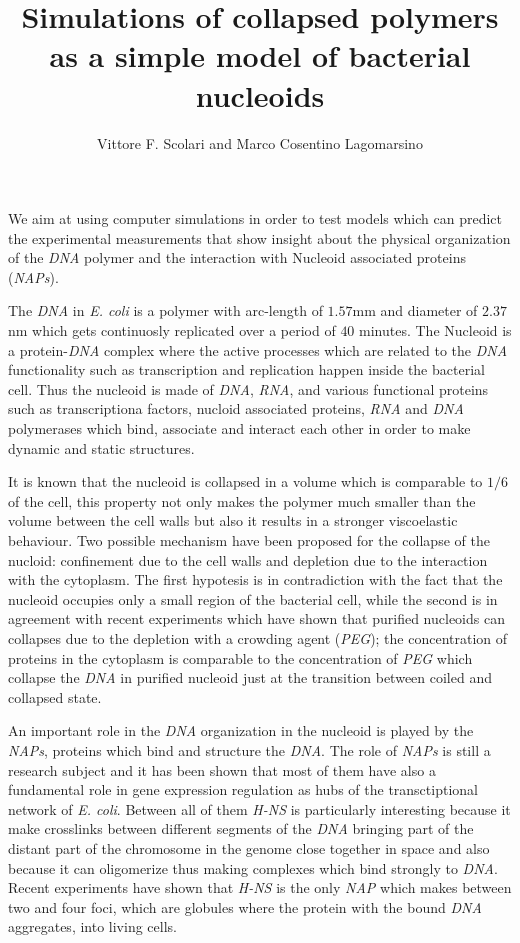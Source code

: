\documentclass[12pt,a4paper,notitlepage]{article}
\newcommand{\hns}{\emph{H-NS}\xspace}
\newcommand{\ecoli}{\emph{E. coli}\xspace}
\newcommand{\dna}{\emph{DNA}\xspace}
\newcommand{\rna}{\emph{RNA}\xspace}
\newcommand{\nap}{\emph{NAP}\xspace}
\newcommand{\naps}{\emph{NAPs}\xspace}
\begin{document}
\title{Simulations of collapsed polymers as a simple model of
  bacterial nucleoids}
\author{Vittore F. Scolari and Marco Cosentino Lagomarsino}
\maketitle
We aim at using computer simulations in order to test models which can
 predict the experimental measurements
\cite{Lieberman2009, Weber2010, Barbieri2012}
that show insight about the physical organization of the \dna polymer and
the interaction with Nucleoid associated proteins (\naps).

The \dna in \ecoli is a polymer with arc-length of $1.57$mm and
diameter of $2.37$nm which gets continuosly replicated over a period
of $40$ minutes. The Nucleoid is a protein-\dna complex where the
active processes which are related to the \dna functionality such as
transcription and replication happen inside the bacterial cell. Thus
the nucleoid is made of \dna, \rna, and various functional proteins such
as transcriptiona factors, nucloid associated proteins, \rna and \dna
polymerases which bind, associate and interact each other in order to
make dynamic and static structures. 

It is known that the nucleoid is collapsed in a volume which is
comparable to $1/6$ of the cell\cite{}, this property not only makes
the polymer much smaller than the volume between the cell walls but
also it results in a
stronger viscoelastic behaviour\cite{Wiggins2010}. Two possible mechanism
have been proposed for the collapse of the
nucloid: confinement due to the cell walls\cite{} and depletion due to
the interaction with the cytoplasm\cite{}. The first hypotesis is in
contradiction with the fact that the nucleoid occupies only a small
region of the bacterial cell, while the second is in agreement with
recent experiments which \cite{Pelletier2012} have shown
that purified nucleoids can collapses due to the depletion with a
crowding agent ({\it PEG}); the concentration of proteins in the
cytoplasm is comparable to the concentration of {\it PEG} which
collapse the \dna in purified nucleoid just at the transition between
coiled and collapsed state.

An important role in the \dna organization in the nucleoid is played
by the \naps, proteins which bind and structure the \dna. The role of
\naps is still a research subject and it has been shown that most of
them have also a fundamental role in gene expression regulation as
hubs of the transctiptional network of \ecoli. Between all of them
\hns is particularly interesting because it make crosslinks between
different segments of the \dna bringing part of the distant part of
the chromosome in the genome close together in space and also because
it can oligomerize thus making complexes which bind strongly to
\dna. Recent experiments have shown that \hns is the only \nap which
makes between two and four foci, which are globules where the protein
with the bound \dna aggregates, into living cells.
\end{document}
